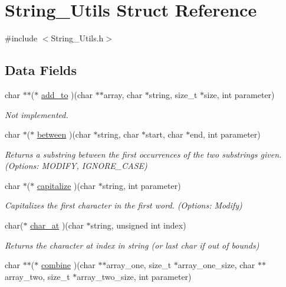 \hypertarget{struct_string___utils}{}\section{String\+\_\+\+Utils Struct Reference}
\label{struct_string___utils}


{\ttfamily \#include $<$String\+\_\+\+Utils.\+h$>$}

\subsection*{Data Fields}
\begin{DoxyCompactItemize}
\item 
char $\ast$$\ast$($\ast$ \hyperlink{struct_string___utils_a0c2d1f4cb2b322fbf9f3d0c402549ff3}{add\+\_\+to} )(char $\ast$$\ast$array, char $\ast$string, size\+\_\+t $\ast$size, int parameter)
\begin{DoxyCompactList}\small\item\em Not implemented. \end{DoxyCompactList}\item 
char $\ast$($\ast$ \hyperlink{struct_string___utils_a66942fc862667d85616e0ce9acf4b2c9}{between} )(char $\ast$string, char $\ast$start, char $\ast$end, int parameter)
\begin{DoxyCompactList}\small\item\em Returns a substring between the first occurrences of the two substrings given. (Options\+: M\+O\+D\+I\+F\+Y, I\+G\+N\+O\+R\+E\+\_\+\+C\+A\+S\+E) \end{DoxyCompactList}\item 
char $\ast$($\ast$ \hyperlink{struct_string___utils_a76ddd153562d3e5cc35b28e6cad86416}{capitalize} )(char $\ast$string, int parameter)
\begin{DoxyCompactList}\small\item\em Capitalizes the first character in the first word. (Options\+: Modify) \end{DoxyCompactList}\item 
char($\ast$ \hyperlink{struct_string___utils_a165241eff2c5eaaf582e1e38f753d36a}{char\+\_\+at} )(char $\ast$string, unsigned int index)
\begin{DoxyCompactList}\small\item\em Returns the character at index in string (or last char if out of bounds) \end{DoxyCompactList}\item 
char $\ast$$\ast$($\ast$ \hyperlink{struct_string___utils_a74a8e43b4ec773c1127882608bc1988a}{combine} )(char $\ast$$\ast$array\+\_\+one, size\+\_\+t $\ast$array\+\_\+one\+\_\+size, char $\ast$$\ast$array\+\_\+two, size\+\_\+t $\ast$array\+\_\+two\+\_\+size, int parameter)
$$
\end{DoxyCompactItemize}
